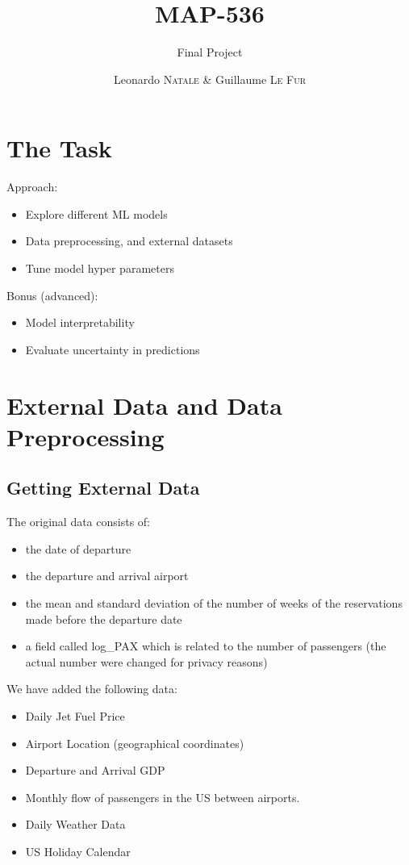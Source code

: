 \documentclass[a4paper,12pt,twoside]{article}
\title{MAP-536}
\subtitle{Final Project}
\author{Leonardo \textsc{Natale} \& Guillaume \textsc{Le Fur}}
\begin{document}
\maketitle

\section{The Task}
Approach:
\begin{itemize}
	\item Explore different ML models
	\item Data preprocessing, and external datasets
	\item Tune model hyper parameters \\

\end{itemize}
Bonus (advanced):
\begin{itemize}
	\item Model interpretability
	\item Evaluate uncertainty in predictions
\end{itemize}

\section{External Data and Data Preprocessing}

\subsection{Getting External Data}
The original data consists of:
\begin{itemize}
	\item the date of departure
	\item the departure and arrival airport
	\item the mean and standard deviation of the number of weeks of the reservations made before the departure date
    \item a field called log\_PAX which is related to the number of passengers (the actual number were changed for privacy reasons)
\end{itemize}

We have added the following data:
\begin{itemize}
	\item Daily Jet Fuel Price
	\item Airport Location (geographical coordinates)
	\item Departure and Arrival GDP
	\item Monthly flow of passengers in the US between airports.
	\item Daily Weather Data
	\item US Holiday Calendar
\end{itemize}
\end{document}
